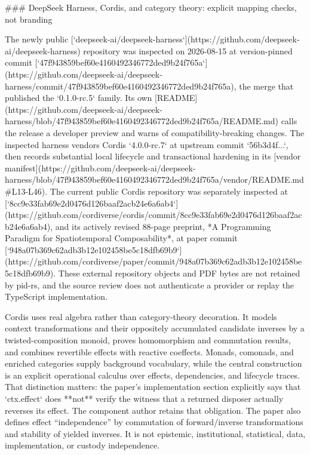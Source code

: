 \documentclass[11pt]{article}
\begin{document}
\begin{markdown}
### DeepSeek Harness, Cordis, and category theory: explicit mapping checks, not branding

The newly public
[`deepseek-ai/deepseek-harness`](https://github.com/deepseek-ai/deepseek-harness) repository was
inspected on 2026-08-15 at version-pinned commit
[`47f943859bef60e4160492346772ded9b24f765a`](https://github.com/deepseek-ai/deepseek-harness/commit/47f943859bef60e4160492346772ded9b24f765a),
the merge that published the `0.1.0-rc.5` family. Its own
[README](https://github.com/deepseek-ai/deepseek-harness/blob/47f943859bef60e4160492346772ded9b24f765a/README.md)
calls the release a developer preview and warns of compatibility-breaking changes. The inspected
harness vendors Cordis `4.0.0-rc.7` at upstream commit `56b3d4f...`, then records substantial local
lifecycle and transactional hardening in its
[vendor manifest](https://github.com/deepseek-ai/deepseek-harness/blob/47f943859bef60e4160492346772ded9b24f765a/vendor/README.md#L13-L46).
The current public Cordis repository was separately inspected at
[`8cc9e33fab69e2d0476d126baaf2acb24e6a6ab4`](https://github.com/cordiverse/cordis/commit/8cc9e33fab69e2d0476d126baaf2acb24e6a6ab4),
and its actively revised 88-page preprint, *A Programming Paradigm for Spatiotemporal
Composability*, at paper commit
[`948a07b369c62adb3b12e102458be5c18dfb69b9`](https://github.com/cordiverse/paper/commit/948a07b369c62adb3b12e102458be5c18dfb69b9).
These external repository objects and PDF bytes are not retained by pid-rs, and the source review
does not authenticate a provider or replay the TypeScript implementation.

Cordis uses real algebra rather than category-theory decoration. It models context transformations
and their oppositely accumulated candidate inverses by a twisted-composition monoid, proves
homomorphism and commutation results, and combines revertible effects with reactive coeffects.
Monads, comonads, and enriched categories supply background vocabulary, while the central
construction is an explicit operational calculus over effects, dependencies, and lifecycle traces.
That distinction matters: the paper's implementation section explicitly says that `ctx.effect`
does **not** verify the witness that a returned disposer actually reverses its effect. The component
author retains that obligation. The paper also defines effect “independence” by commutation of
forward/inverse transformations and stability of yielded inverses. It is not epistemic,
institutional, statistical, data, implementation, or custody independence.


\end{markdown}
\end{document}

